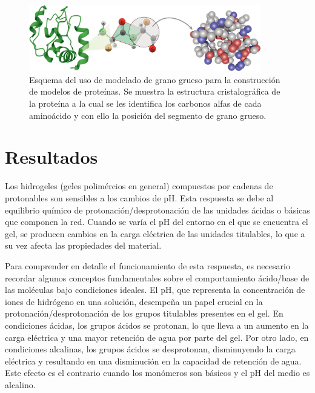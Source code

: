 \begin{figure}[!htb]
	\centering
	\includegraphics[width=0.9\textwidth]{Figures/modelos/cg_proteinas.png}
	\caption{Esquema del uso de modelado de grano grueso para la construcci\'on de modelos de prote\'inas. Se muestra la estructura cristalogr\'afica de la prote\'ina  a la cual se les identifica los carbonos alfas de cada amino\'acido y con ello la posici\'on del segmento de grano grueso.}
	\label{fig:film:cg_protein}
\end{figure}




\section{Resultados} \label{sec:film:resultados}


Los hidrogeles (geles polim\'ercios en general) compuestos por cadenas de protonables son sensibles a los cambios de pH. Esta respuesta se debe al equilibrio qu\'imico de protonaci\'on/desprotonaci\'on de las unidades \'acidas o b\'asicas que componen la red. Cuando se var\'ia el pH del entorno en el que se encuentra el gel, se producen cambios en la carga el\'ectrica de las unidades titulables, lo que a su vez afecta las propiedades  del material.

Para comprender en detalle el funcionamiento de esta respuesta, es necesario recordar algunos conceptos fundamentales sobre el comportamiento \'acido/base de las mol\'eculas bajo condiciones ideales. El pH, que representa la concentraci\'on de iones de hidr\'ogeno en una soluci\'on, desempe\~na un papel crucial en la protonaci\'on/desprotonaci\'on de los grupos titulables presentes en el gel. En condiciones \'acidas, los grupos \'acidos se protonan, lo que lleva a un aumento en la carga el\'ectrica y una mayor retenci\'on de agua por parte del gel. Por otro lado, en condiciones alcalinas, los grupos \'acidos se desprotonan, disminuyendo la carga el\'ectrica y resultando en una disminuci\'on en la capacidad de retenci\'on de agua. Este efecto es el contrario cuando los mon\'omeros son b\'asicos y el pH del medio es alcalino.


